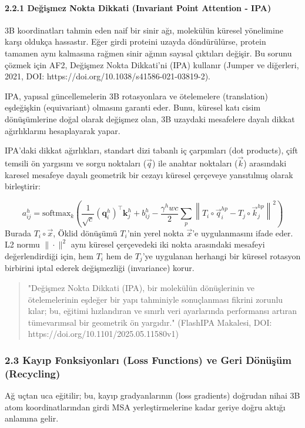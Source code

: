 \documentclass[11pt,a4paper]{article}
\begin{document}
\paragraph{2.2.1 Değişmez Nokta Dikkati (Invariant Point Attention - IPA)}
3B koordinatları tahmin eden naif bir sinir ağı, molekülün küresel yönelimine karşı oldukça hassastır. Eğer girdi proteini uzayda döndürülürse, protein tamamen aynı kalmasına rağmen sinir ağının sayısal çıktıları değişir. Bu sorunu çözmek için AF2, Değişmez Nokta Dikkati'ni (IPA) kullanır (Jumper ve diğerleri, 2021, DOI: https://doi.org/10.1038/s41586-021-03819-2).

IPA, yapısal güncellemelerin 3B rotasyonlara ve ötelemelere (translation) eşdeğişkin (equivariant) olmasını garanti eder. Bunu, küresel katı cisim dönüşümlerine doğal olarak değişmez olan, 3B uzaydaki mesafelere dayalı dikkat ağırlıklarını hesaplayarak yapar.

IPA'daki dikkat ağırlıkları, standart dizi tabanlı iç çarpımları (dot products), çift temsili ön yargısını ve sorgu noktaları (\(\vec{q}\)) ile anahtar noktaları (\(\vec{k}\)) arasındaki karesel mesafeye dayalı geometrik bir cezayı küresel çerçeveye yansıtılmış olarak birleştirir:

\[
a_{ij}^h = \text{softmax}_k \left( \frac{1}{\sqrt{c}} (\mathbf{q}_i^h)^\top \mathbf{k}_j^h + b_{ij}^h - \frac{\gamma^h w c}{2} \sum_p \left\| T_i \circ \vec{q}_{i}^{hp} - T_j \circ \vec{k}_{j}^{hp} \right\|^2 \right)
\]
Burada \(T_i \circ \vec{x}\), Öklid dönüşümü \(T_i\)'nin yerel nokta \(\vec{x}\)'e uygulanmasını ifade eder. L2 normu \(\| \cdot \|^2\) aynı küresel çerçevedeki iki nokta arasındaki mesafeyi değerlendirdiği için, hem \(T_i\) hem de \(T_j\)'ye uygulanan herhangi bir küresel rotasyon birbirini iptal ederek değişmezliği (invariance) korur.

\begin{quote}
"Değişmez Nokta Dikkati (IPA), bir molekülün dönüşlerinin ve ötelemelerinin eşdeğer bir yapı tahminiyle sonuçlanması fikrini zorunlu kılar; bu, eğitimi hızlandıran ve sınırlı veri ayarlarında performansı artıran tümevarımsal bir geometrik ön yargıdır." (FlashIPA Makalesi, DOI: https://doi.org/10.1101/2025.05.11580v1)
\end{quote}
\subsubsection{2.3 Kayıp Fonksiyonları (Loss Functions) ve Geri Dönüşüm (Recycling)}
Ağ uçtan uca eğitilir; bu, kayıp gradyanlarının (loss gradients) doğrudan nihai 3B atom koordinatlarından girdi MSA yerleştirmelerine kadar geriye doğru aktığı anlamına gelir.
\end{document}
